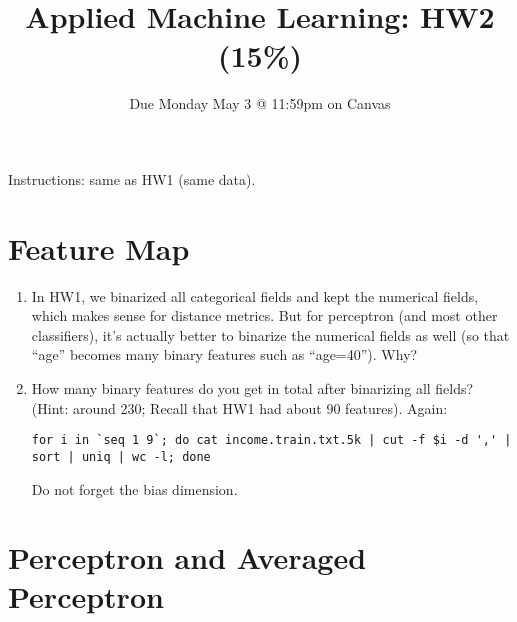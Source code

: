 \documentclass[11pt]{article}
\title{Applied Machine Learning: HW2 (15\%)}
\author{Due {Monday May 3} @ 11:59pm on Canvas}
\date{}
\begin{document}
\maketitle

Instructions: same as HW1 (same data).


\section{Feature Map}

\begin{enumerate}

\item In HW1, we binarized all categorical fields and kept the numerical fields, which makes sense for distance metrics. But for perceptron (and most other classifiers),
it's actually better to binarize the numerical fields as well 
(so that ``age'' becomes many binary features such as ``age=40'').
Why?

\item How many binary features do you get in total after binarizing all fields? (Hint: around 230; Recall that HW1 had about 90 features). Again:

\begin{verbatim}
for i in `seq 1 9`; do cat income.train.txt.5k | cut -f $i -d ',' | sort | uniq | wc -l; done
\end{verbatim}

Do not forget the bias dimension.
 

\end{enumerate}

\section{Perceptron and Averaged Perceptron}
\end{document}
